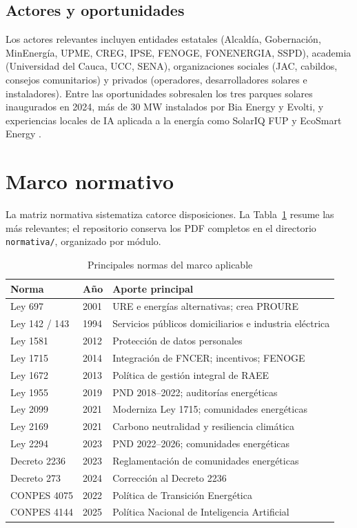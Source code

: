\documentclass[journal]{IEEEtran}
\begin{document}
\subsection{Actores y oportunidades}
Los actores relevantes incluyen entidades estatales (Alcaldía, Gobernación, MinEnergía, UPME, CREG, IPSE, FENOGE, FONENERGIA, SSPD), academia (Universidad del Cauca, UCC, SENA), organizaciones sociales (JAC, cabildos, consejos comunitarios) y privados (operadores, desarrolladores solares e instaladores). Entre las oportunidades sobresalen los tres parques solares inaugurados en 2024, más de 30 MW instalados por Bia Energy y Evolti, y experiencias locales de IA aplicada a la energía como SolarIQ FUP y EcoSmart Energy \cite{r16}.

\section{Marco normativo}
La matriz normativa sistematiza catorce disposiciones. La Tabla~\ref{tab:normas} resume las más relevantes; el repositorio conserva los PDF completos en el directorio \texttt{normativa/}, organizado por módulo.

\begin{table}[t]
\caption{Principales normas del marco aplicable}
\label{tab:normas}
\centering
\footnotesize
\begin{tabular}{@{}lll@{}}
\toprule
Norma & Año & Aporte principal \\
\midrule
Ley 697 & 2001 & URE e energías alternativas; crea PROURE \\
Ley 142 / 143 & 1994 & Servicios públicos domiciliarios e industria eléctrica \\
Ley 1581 & 2012 & Protección de datos personales \\
Ley 1715 & 2014 & Integración de FNCER; incentivos; FENOGE \\
Ley 1672 & 2013 & Política de gestión integral de RAEE \\
Ley 1955 & 2019 & PND 2018--2022; auditorías energéticas \\
Ley 2099 & 2021 & Moderniza Ley 1715; comunidades energéticas \\
Ley 2169 & 2021 & Carbono neutralidad y resiliencia climática \\
Ley 2294 & 2023 & PND 2022--2026; comunidades energéticas \\
Decreto 2236 & 2023 & Reglamentación de comunidades energéticas \\
Decreto 273 & 2024 & Corrección al Decreto 2236 \\
CONPES 4075 & 2022 & Política de Transición Energética \\
CONPES 4144 & 2025 & Política Nacional de Inteligencia Artificial \\
\bottomrule
\end{tabular}
\end{table}
\end{document}
